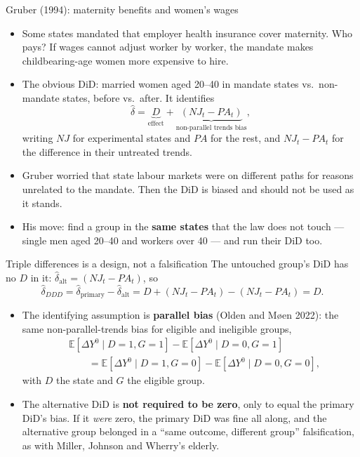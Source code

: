 \documentclass[
  11pt,
  ignorenonframetext,
  aspectratio=169,
]{beamer}
\providecommand{\tightlist}{%
  \setlength{\itemsep}{0pt}\setlength{\parskip}{0pt}}
\begin{document}
\begin{frame}{Gruber (1994): maternity benefits and women's wages}
\protect{}\label{gruber-1994-maternity-benefits-and-womens-wages}
\begin{itemize}
\tightlist
\item
  Some states mandated that employer health insurance cover maternity.
  Who pays? If wages cannot adjust worker by worker, the mandate makes
  childbearing-age women more expensive to hire.
\item
  The obvious DiD: married women aged 20--40 in mandate states
  vs.~non-mandate states, before vs.~after. It identifies \[
  \hat\delta = \underbrace{D}_{\text{effect}} + \underbrace{(NJ_t - PA_t)}_{\text{non-parallel trends bias}},
  \] writing \(NJ\) for experimental states and \(PA\) for the rest, and
  \(NJ_t - PA_t\) for the difference in their untreated trends.
\item
  Gruber worried that state labour markets were on different paths for
  reasons unrelated to the mandate. Then the DiD is biased and should
  not be used as it stands.
\item
  His move: find a group in the \textbf{same states} that the law does
  not touch --- single men aged 20--40 and workers over 40 --- and run
  their DiD too.
\end{itemize}
\end{frame}

\begin{frame}{Triple differences is a design, not a falsification}
\protect{}\label{triple-differences-is-a-design-not-a-falsification}
The untouched group's DiD has no \(D\) in it:
\(\hat\delta_{\text{alt}} = (NJ_t - PA_t)\), so \[
\hat\delta_{DDD} = \hat\delta_{\text{primary}} - \hat\delta_{\text{alt}} = D + (NJ_t - PA_t) - (NJ_t - PA_t) = D.
\]

\begin{itemize}
\tightlist
\item
  The identifying assumption is \textbf{parallel bias} (Olden and Møen
  2022): the same non-parallel-trends bias for eligible and ineligible
  groups, \[
  \begin{aligned}
  &\mathbb{E}[\Delta Y^0 \mid D=1, G=1] - \mathbb{E}[\Delta Y^0 \mid D=0, G=1] \\
  &\qquad = \mathbb{E}[\Delta Y^0 \mid D=1, G=0] - \mathbb{E}[\Delta Y^0 \mid D=0, G=0],
  \end{aligned}
  \] with \(D\) the state and \(G\) the eligible group.
\item
  The alternative DiD is \textbf{not required to be zero}, only to equal
  the primary DiD's bias. If it \emph{were} zero, the primary DiD was
  fine all along, and the alternative group belonged in a ``same
  outcome, different group'' falsification, as with Miller, Johnson and
  Wherry's elderly.
\end{itemize}
\end{frame}
\end{document}
